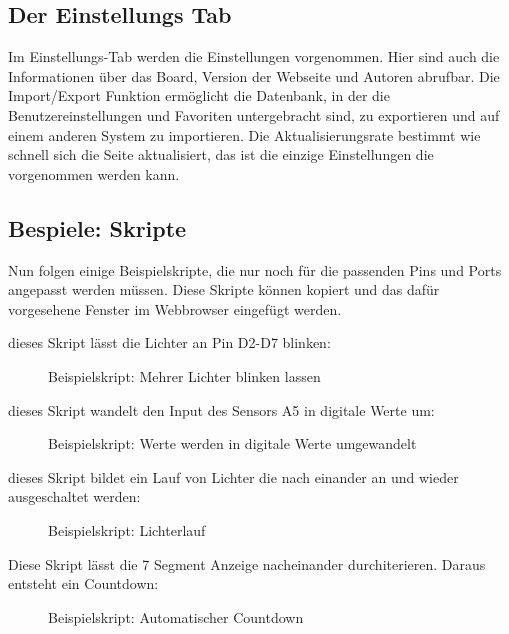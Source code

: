 \subsection{Der Einstellungs Tab}
Im Einstellungs-Tab werden die Einstellungen vorgenommen. Hier sind auch die
Informationen über das Board, Version der Webseite und Autoren abrufbar. Die
Import/Export Funktion ermöglicht die Datenbank, in der die Benutzereinstellungen
und Favoriten untergebracht sind, zu exportieren und auf einem anderen System zu
importieren. Die Aktualisierungsrate bestimmt wie schnell sich die Seite
aktualisiert, das ist die einzige Einstellungen die vorgenommen werden kann.

\subsection{Bespiele: Skripte}
Nun folgen einige Beispielskripte, die nur noch für die passenden Pins und Ports angepasst
werden müssen. Diese Skripte können kopiert und das dafür vorgesehene Fenster
im Webbrowser eingefügt werden.

dieses Skript lässt die Lichter an Pin D2-D7 blinken:\newline
\begin{figure}[H]

\caption{Beispielskript: Mehrer Lichter blinken lassen}
\label{output}
\end{figure}

dieses Skript wandelt den Input des Sensors A5 in digitale Werte um:\newline
\begin{figure}[H]

\caption{Beispielskript: Werte werden in digitale Werte umgewandelt}
\label{output}
\end{figure}

dieses Skript bildet ein Lauf von Lichter die nach einander an und wieder
ausgeschaltet werden:\newline

\begin{figure}[H]

\caption{Beispielskript: Lichterlauf}
\label{output}
\end{figure}

Diese Skript lässt die 7 Segment Anzeige nacheinander durchiterieren.
Daraus entsteht ein Countdown:\newline
\begin{figure}[H]

\caption{Beispielskript: Automatischer Countdown}
\label{output}
\end{figure}